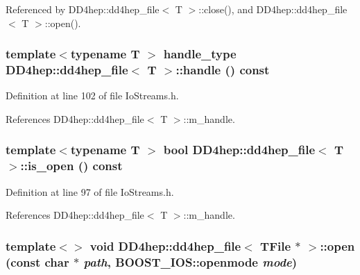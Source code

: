Referenced by DD4hep::dd4hep\_\-file$<$ T $>$::close(), and DD4hep::dd4hep\_\-file$<$ T $>$::open().\hypertarget{class_d_d4hep_1_1dd4hep__file_abad64676eda7a137560b48492beb8f24}{
\subsubsection[{handle}]{\setlength{\rightskip}{0pt plus 5cm}template$<$typename T $>$ {\bf handle\_\-type} {\bf DD4hep::dd4hep\_\-file}$<$ {\bf T} $>$::handle () const}}
\label{class_d_d4hep_1_1dd4hep__file_abad64676eda7a137560b48492beb8f24}


Definition at line 102 of file IoStreams.h.

References DD4hep::dd4hep\_\-file$<$ T $>$::m\_\-handle.\hypertarget{class_d_d4hep_1_1dd4hep__file_a47a3a4df1f886d13b4611fe4bec459b9}{
\subsubsection[{is\_\-open}]{\setlength{\rightskip}{0pt plus 5cm}template$<$typename T $>$ bool {\bf DD4hep::dd4hep\_\-file}$<$ {\bf T} $>$::is\_\-open () const}}
\label{class_d_d4hep_1_1dd4hep__file_a47a3a4df1f886d13b4611fe4bec459b9}


Definition at line 97 of file IoStreams.h.

References DD4hep::dd4hep\_\-file$<$ T $>$::m\_\-handle.\hypertarget{class_d_d4hep_1_1dd4hep__file_a6f4deaa2542f09089611f0549a9a816d}{
\subsubsection[{open}]{\setlength{\rightskip}{0pt plus 5cm}template$<$$>$ void {\bf DD4hep::dd4hep\_\-file}$<$ TFile $\ast$ $>$::open (const char $\ast$ {\em path}, \/  BOOST\_\-IOS::openmode {\em mode})}}
\label{class_d_d4hep_1_1dd4hep__file_a6f4deaa2542f09089611f0549a9a816d}



